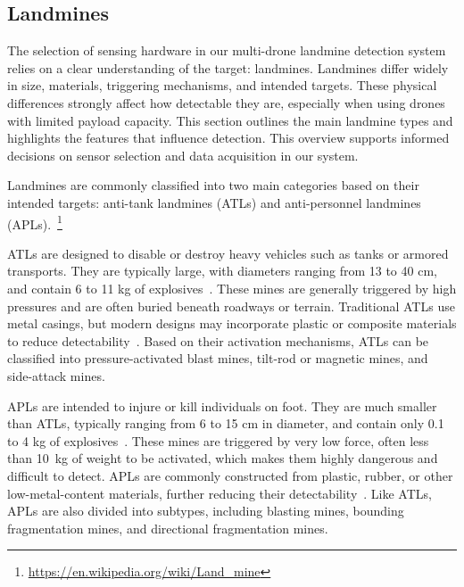 \subsection{Landmines}

The selection of sensing hardware in our multi-drone landmine detection system relies on a clear understanding of the target: landmines. Landmines differ widely in size, materials, triggering mechanisms, and intended targets. These physical differences strongly affect how detectable they are, especially when using drones with limited payload capacity. This section outlines the main landmine types and highlights the features that influence detection. This overview supports informed decisions on sensor selection and data acquisition in our system.

Landmines are commonly classified into two main categories based on their intended targets: anti-tank landmines (ATLs) and anti-personnel landmines (APLs).~\footnote{\url{https://en.wikipedia.org/wiki/Land_mine}}

ATLs are designed to disable or destroy heavy vehicles such as tanks or armored transports. They are typically large, with diameters ranging from 13 to 40 cm, and contain 6 to 11 kg of explosives~\cite{paik2002image}. These mines are generally triggered by high pressures and are often buried beneath roadways or terrain. Traditional ATLs use metal casings, but modern designs may incorporate plastic or composite materials to reduce detectability~\cite{evans2024detection}. Based on their activation mechanisms, ATLs can be classified into pressure-activated blast mines, tilt-rod or magnetic mines, and side-attack mines.

APLs are intended to injure or kill individuals on foot. They are much smaller than ATLs, typically ranging from 6 to 15 cm in diameter, and contain only 0.1 to 4 kg of explosives~\cite{paik2002image}. These mines are triggered by very low force, often less than 10~kg of weight to be activated, which makes them highly dangerous and difficult to detect. APLs are commonly constructed from plastic, rubber, or other low-metal-content materials, further reducing their detectability~\cite{kaya2017buried}. Like ATLs, APLs are also divided into subtypes, including blasting mines, bounding fragmentation mines, and directional fragmentation mines.

